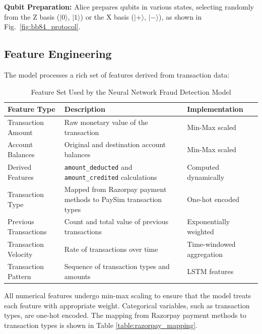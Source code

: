 \documentclass[onecolumn,a4paper,10pt]{IEEEtran}
\begin{document}
\textbf{Qubit Preparation:} Alice prepares qubits in various states, selecting randomly from the Z basis ($|0\rangle$, $|1\rangle$) or the X basis ($|+\rangle$, $|-\rangle$), as shown in Fig.~\ref{fig:bb84_protocol}.

\subsection{Feature Engineering}

The model processes a rich set of features derived from transaction data:

\begin{table}[!htb]
\centering
\small
\setlength{\tabcolsep}{4pt}
\begin{tabular}{|p{2.8cm}|p{7cm}|p{2.8cm}|}
\hline
\cellcolor{lightblue!30}\textbf{Feature Type} & \cellcolor{lightblue!30}\textbf{Description} & \cellcolor{lightblue!30}\textbf{Implementation} \\
\hline
Transaction Amount & Raw monetary value of the transaction & Min-Max scaled \\
\hline
Account Balances & Original and destination account balances & Min-Max scaled \\
\hline
Derived Features & \texttt{amount\_deducted} and \texttt{amount\_credited} calculations & Computed dynamically \\
\hline
Transaction Type & Mapped from Razorpay payment methods to PaySim transaction types & One-hot encoded \\
\hline
Previous Transactions & Count and total value of previous transactions & Exponentially weighted \\
\hline
Transaction Velocity & Rate of transactions over time & Time-windowed aggregation \\
\hline
Transaction Pattern & Sequence of transaction types and amounts & LSTM features \\
\hline
\end{tabular}
\caption{Feature Set Used by the Neural Network Fraud Detection Model}
\label{table:features}
\end{table}

All numerical features undergo min-max scaling to ensure that the model treats each feature with appropriate weight. Categorical variables, such as transaction types, are one-hot encoded. The mapping from Razorpay payment methods to transaction types is shown in Table \ref{table:razorpay_mapping}.
\end{document}
